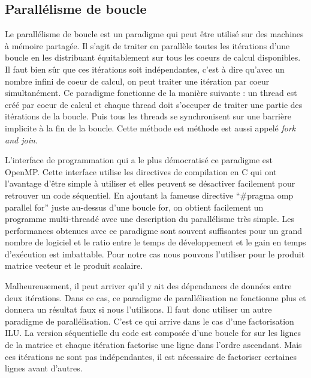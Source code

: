 \subsection{Parallélisme de boucle}
Le parallélisme de boucle est un paradigme qui peut être utilisé sur des machines à mémoire partagée.
%
Il s'agit de traiter en parallèle toutes les itérations d'une boucle en les distribuant équitablement sur tous les coeurs de calcul disponibles.
%
Il faut bien sûr que ces itérations soit indépendantes, c'est à dire qu'avec un nombre infini de coeur de calcul, on peut traiter une itération par coeur simultanément.
%
Ce paradigme fonctionne de la manière suivante : un thread est créé par coeur de calcul et chaque thread doit s'occuper de traiter une partie des itérations de la boucle.
%
Puis tous les threads se synchronisent sur une barrière implicite à la fin de la boucle.
%
Cette méthode est méthode est aussi appelé {\em fork and join}.


L'interface de programmation qui a le plus démocratisé ce paradigme est OpenMP.
%
Cette interface utilise les directives de compilation en C qui ont l'avantage d'être simple à utiliser et elles peuvent se désactiver facilement pour retrouver un code séquentiel.
%
En ajoutant la fameuse directive ``\#pragma omp parallel for'' juste au-dessus d'une boucle for, on obtient facilement un programme multi-threadé avec une description du parallélisme très simple.
%
Les performances obtenues avec ce paradigme sont souvent suffisantes pour un grand nombre de logiciel et le ratio entre le temps de développement et le gain en temps d'exécution est imbattable.
%
Pour notre cas nous pouvons l'utiliser pour le produit matrice vecteur et le produit scalaire.


Malheureusement, il peut arriver qu'il y ait des dépendances de données entre deux itérations.
%
Dans ce cas, ce paradigme de parallélisation ne fonctionne plus et donnera un résultat faux si nous l'utilisons.
%
Il faut donc utiliser un autre paradigme de parallélisation.
%
C'est ce qui arrive dans le cas d'une factorisation ILU.
%
La version séquentielle du code est composée d'une boucle for sur les lignes de la matrice et chaque itération factorise une ligne dans l'ordre ascendant.
%
Mais ces itérations ne sont pas indépendantes, il est nécessaire de factoriser certaines lignes avant d'autres.
